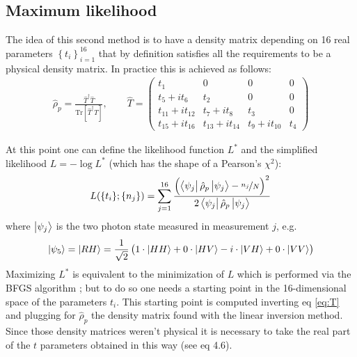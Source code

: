 \documentclass[a4paper, 11pt]{article}
\begin{document}
    \subsection{Maximum likelihood}
      The idea of this second method is to have a density matrix depending on 16 real parameters $\left\{t_i \right\}_{i=1}^{16}$ that by definition satisfies all the requirements to be a physical density matrix. In practice this is achieved as follows:
      \begin{gather} \label{eq:T}
        \hat{\rho}_p = \frac{\hat{T}^\dagger \hat{T}}{\text{Tr}[\hat{T}^\dagger \hat{T}]}, \qquad
        \hat{T} =
        \begin{pmatrix}
          t_1 & 0 & 0 & 0 \\
          t_5 + it_6 & t_2 & 0 & 0 \\
          t_{11} + it_{12} & t_7 + it_8 & t_3 & 0 \\
          t_{15} + it_{16} & t_{13} + it_{14} & t_9 + it_{10} & t_4
        \end{pmatrix}
      \end{gather}

      At this point one can define the likelihood function $L^*$ and the simplified likelihood $L = -\log{L^*}$ (which has the shape of a Pearson's $\chi^2$):
      \begin{equation*}
        L(\{t_i\}; \{n_j\}) = \sum_{j=1}^{16} \frac{\left(\bra{\psi_j}\hat{\rho}_p \ket{\psi_j} - \frac[f]{n_j}{N} \right)^2 }{2\bra{\psi_j}\hat{\rho}_p \ket{\psi_j}}
      \end{equation*}
      where $\ket{\psi_j}$ is the two photon state measured in measurement $j$, e.g.
      \begin{equation*}
        \ket{\psi_5} = \ket{RH} = \frac{1}{\sqrt{2}} \left(1\cdot\ket{HH} + 0\cdot\ket{HV} -i\cdot\ket{VH} +0\cdot\ket{VV} \right)
      \end{equation*}
      Maximizing $L^*$ is equivalent to the minimization of $L$ which is performed via the BFGS algorithm \cite{rif:bfgs}; but to do so one needs a starting point in the 16-dimensional space of the parameters $t_i$. This starting point is computed inverting eq \ref{eq:T} and plugging for $\hat{\rho}_p$ the density matrix found with the linear inversion method. Since those density matrices weren't physical it is necessary to take the real part of the $t$ parameters obtained in this way (see \cite{rif:tomo} eq 4.6).
\end{document}
